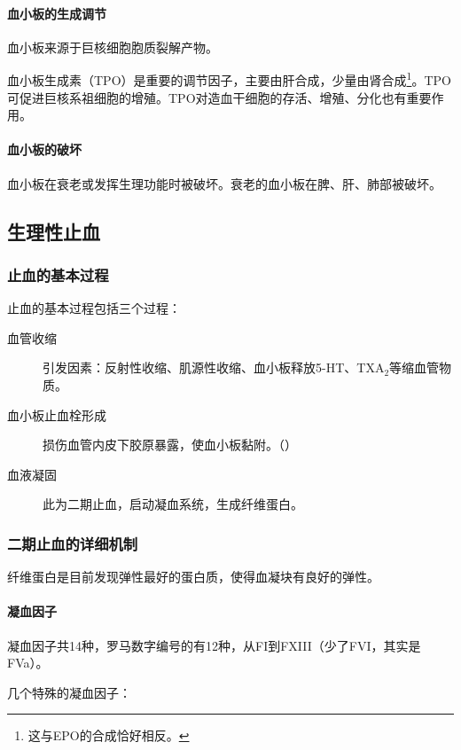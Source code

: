 \paragraph{血小板的生成调节}

血小板来源于巨核细胞胞质裂解产物。

血小板生成素（TPO）是重要的调节因子，主要由肝合成，少量由肾合成\footnote{这与EPO的合成恰好相反。}。TPO可促进巨核系祖细胞的增殖。TPO对造血干细胞的存活、增殖、分化也有重要作用。

\paragraph{血小板的破坏}

血小板在衰老或发挥生理功能时被破坏。衰老的血小板在脾、肝、肺部被破坏。

\subsection{生理性止血}

\subsubsection{止血的基本过程}

止血的基本过程包括三个过程：

\begin{description}
	\item[血管收缩] 引发因素：反射性收缩、肌源性收缩、血小板释放5-HT、TXA$_{2}$等缩血管物质。
	\item[血小板止血栓形成] 损伤血管内皮下胶原暴露，使血小板黏附。（）
	\item[血液凝固] 此为二期止血，启动凝血系统，生成纤维蛋白。
\end{description}


\subsubsection{二期止血的详细机制}

纤维蛋白是目前发现弹性最好的蛋白质，使得血凝块有良好的弹性。

\paragraph{凝血因子}

凝血因子共14种，罗马数字编号的有12种，从FI到FXIII（少了FVI，其实是FVa）。

几个特殊的凝血因子：

